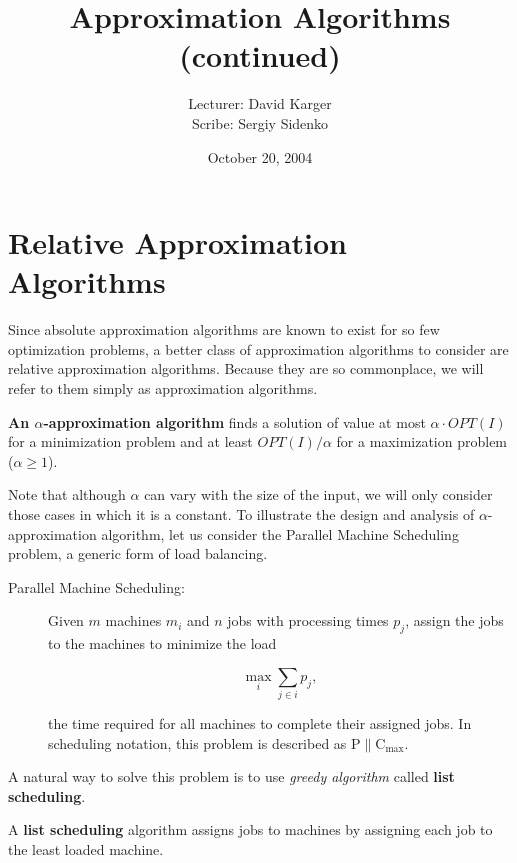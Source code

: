 \documentclass{article}
\title{Approximation Algorithms (continued)}
\date{October 20, 2004}
\author{Lecturer: David Karger\\ Scribe: Sergiy Sidenko}
\begin{document}
\maketitle

\section{Relative Approximation Algorithms}

Since absolute approximation algorithms are known to exist for so few optimization problems, a
better class of approximation algorithms to consider are relative approximation algorithms.
Because they are so commonplace, we will refer to them simply as approximation algorithms.

\begin{definition}
  \textbf{An $\alpha$-approximation algorithm} finds a solution of value at most $\alpha \cdot
  OPT(I)$ for a minimization problem and at least $OPT(I) / \alpha$ for a maximization problem ($\alpha \ge 1$).
\end{definition}

Note that although $\alpha$ can vary with the size of the input, we will only consider those cases
in which it is a constant. To illustrate the design and analysis of $\alpha$-approximation
algorithm, let us consider the Parallel Machine Scheduling problem, a generic form of load
balancing.

\begin{description}
\item[Parallel Machine Scheduling:]

Given $m$ machines $m_i$ and $n$ jobs with processing times $p_j$, assign the jobs to the machines
to minimize the load

$$
\max\limits_{i} \sum\limits_{j \in i} p_j,
$$

the time required for all machines to complete their assigned jobs. In scheduling notation, this
problem is described as $\mathrm {P \parallel C_{\max}}$.

\end{description}

A natural way to solve this problem is to use \textit{greedy algorithm} called \textbf{list
scheduling}.

\begin{definition}
A \textbf{list scheduling} algorithm assigns jobs to machines by assigning each job to the least
loaded machine.
\end{definition}
\end{document}
